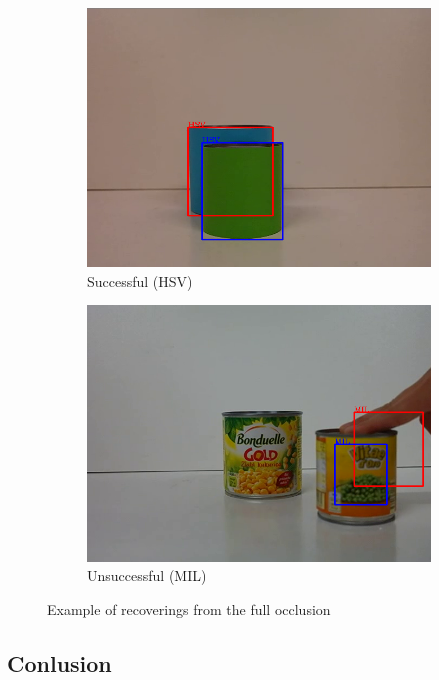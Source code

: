 \begin{figure}
\centering
\begin{subfigure}{0.48\linewidth}
\includegraphics[width=\linewidth]{img/experiments/color-occlusion.png}
\caption{Successful (HSV)}
\end{subfigure}
\begin{subfigure}{0.48\linewidth}
\includegraphics[width=\linewidth]{img/experiments/occlusion.png}
\caption{Unsuccessful (MIL)}
\end{subfigure}
\caption{Example of recoverings from the full occlusion}
\label{fig:occlusion}
\end{figure}

\subsection{Conlusion}

